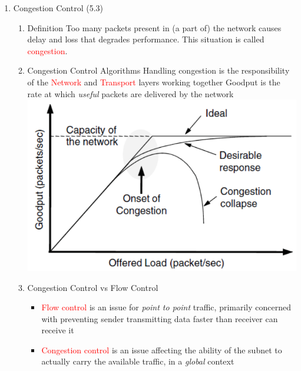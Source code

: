 \documentclass[a4paper,10pt]{article}
\newcommand{\red}[1]{\textcolor{red}{#1}}
\begin{document}
\begin{enumerate}
  \item Congestion Control (5.3)
    \begin{enumerate}
      \item Definition
        \newline Too many packets present in (a part of) the network causes delay and loss that degrades performance. This situation is called \red{congestion}.
      \item Congestion Control Algorithms
        \newline Handling congestion is the responsibility of the \red{Network} and \red{Transport} layers working together
        \newline Goodput is the rate at which \textit{useful} packets are delivered by the network
        \newline\includegraphics[width=\textwidth]{congestion}
      \item Congestion Control vs Flow Control
        \begin{itemize}
          \item \red{Flow control} is an issue for \textit{point to point} traffic, primarily concerned with preventing sender transmitting data faster than receiver can receive it
          \item \red{Congestion control} is an issue affecting the ability of the subnet to actually carry the available traffic, in a \textit{global} context
        \end{itemize}
    \end{enumerate}
\end{enumerate}
\end{document}
